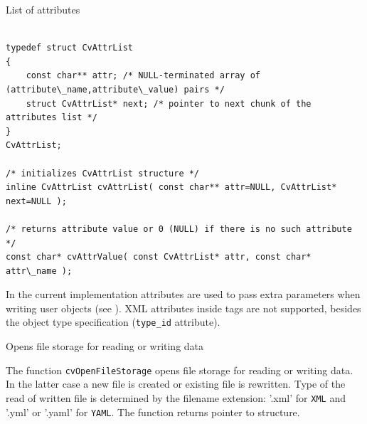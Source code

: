 \label{CvAttrList}

List of attributes

\begin{lstlisting}

typedef struct CvAttrList
{
    const char** attr; /* NULL-terminated array of (attribute\_name,attribute\_value) pairs */
    struct CvAttrList* next; /* pointer to next chunk of the attributes list */
}
CvAttrList;

/* initializes CvAttrList structure */
inline CvAttrList cvAttrList( const char** attr=NULL, CvAttrList* next=NULL );

/* returns attribute value or 0 (NULL) if there is no such attribute */
const char* cvAttrValue( const CvAttrList* attr, const char* attr\_name );

\end{lstlisting}

In the current implementation attributes are used to pass extra parameters when writing user objects (see ). XML attributes inside tags are not supported, besides the object type specification (\texttt{type\_id} attribute).

\label{OpenFileStorage}

Opens file storage for reading or writing data


\begin{description}
\end{description}

The function \texttt{cvOpenFileStorage} opens file storage for
reading or writing data. In the latter case a new file is created
or existing file is rewritten. Type of the read of written file is
determined by the filename extension: '.xml' for \texttt{XML}
and '.yml' or '.yaml' for \texttt{YAML}. The function
returns pointer to  structure.

